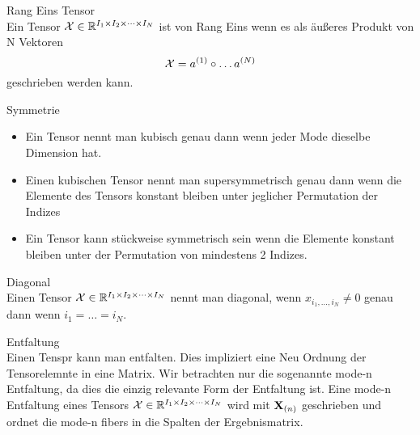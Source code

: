 \begin{Definition} Rang Eins Tensor \\
Ein Tensor ${\cal X}  \in \mathbb{R}^{I_1 \times I_2 \times \dots \times I_N}$ ist von Rang Eins wenn es als äußeres Produkt von N Vektoren
\begin{equation*}
{\cal{X}} = a^{(1)} \circ \dots a^{(N)}
\end{equation*}
geschrieben werden kann.
\end{Definition}

\begin{Bemerkung} Symmetrie \\
\begin{itemize}
\item Ein Tensor nennt man kubisch genau dann wenn jeder Mode dieselbe Dimension hat. 
\item Einen kubischen Tensor nennt man supersymmetrisch genau dann wenn die Elemente des Tensors konstant bleiben unter jeglicher Permutation der Indizes
\item Ein Tensor kann stückweise symmetrisch sein wenn die Elemente konstant bleiben unter der Permutation von mindestens 2 Indizes.
\end{itemize}
\end{Bemerkung}

\begin{Definition} Diagonal \\
Einen Tensor ${\cal X}  \in \mathbb{R}^{I_1 \times I_2 \times \dots \times I_N}$ nennt man diagonal, wenn
$x_{i_1,\dots,i_N} \neq 0$ genau dann wenn $i_1 = \dots = i_N$.
\end{Definition}

\begin{Bemerkung} Entfaltung \\
Einen Tenspr kann man entfalten. Dies impliziert eine Neu Ordnung der Tensorelemnte in eine Matrix.
Wir betrachten nur die sogenannte mode-n Entfaltung, da dies die einzig relevante Form der Entfaltung ist.
Eine mode-n Entfaltung eines Tensors ${\cal X}  \in \mathbb{R}^{I_1 \times I_2 \times \dots \times I_N}$ wird mit $\bold{X}_{(n)}$ geschrieben und ordnet die mode-n fibers in die Spalten der Ergebnismatrix.

\end{Bemerkung}